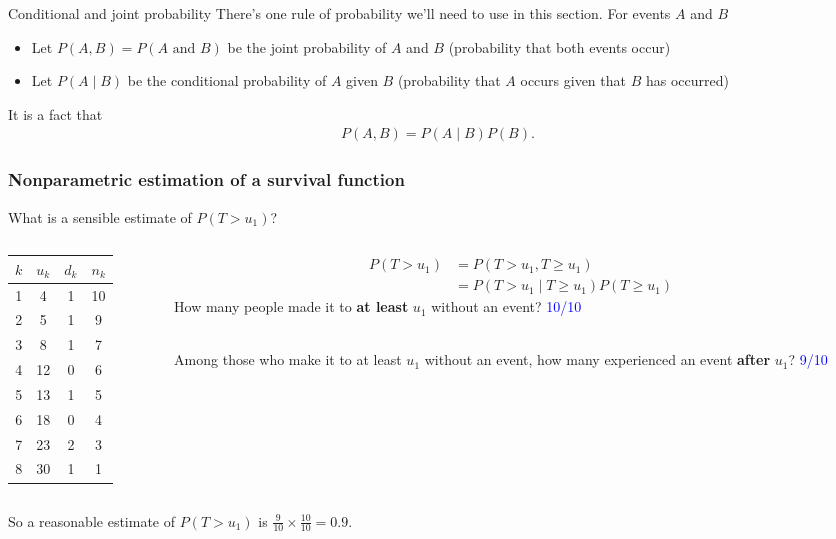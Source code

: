 \documentclass[10pt,t]{beamer}
\begin{document}
\begin{frame}{Conditional and joint probability}
	There's one rule of probability we'll need to use in this section. For events $A$ and $B$
	\begin{itemize}
		\item Let $P(A, B) = P(A \text{ and } B)$ be the joint probability of $A$ and $B$ (probability that both events occur)
		\item Let $P(A \mid B)$ be the conditional probability of $A$ given $B$ (probability that $A$ occurs given that $B$ has occurred)
	\end{itemize}
	It is a fact that
	\begin{align*}
		P(A, B) = P(A \mid B)P(B).
	\end{align*}
\end{frame}

\begin{frame}
\frametitle{Nonparametric estimation of a survival function}
What is a sensible estimate of $P(T > u_1)$?

\begin{columns}
	\begin{column}{0.3\textwidth}
		\begin{center}
\begin{tabular}{|c|c|c|c|}
	\hline
	$k$ & $u_k$ & $d_k$ & $n_k$ \\
	\hline
	1 & 4 & 1 & 10 \\
	2& 5 & 1 & 9 \\
	3& 8 & 1 & 7 \\
	4&12 & 0 & 6 \\
	5&13 & 1 & 5 \\
	6&18 & 0 & 4 \\
	7&23 & 2 & 3 \\
	8&30 & 1 & 1 \\
	\hline
\end{tabular}
	\end{center}
	\end{column}
	\begin{column}{0.7\textwidth}  %
		\begin{align*}
			P(T > u_1) &= P(T > u_1, T\geq u_1) \\
			&= P(T > u_1 \mid T \geq u_1)P(T \geq u_1)
		\end{align*}
		How many people made it to \textbf{at least} $u_1$ without an event? \pause \textcolor{blue}{10/10}
		\\ ~\ 
		
		Among those who make it to at least $u_1$ without an event, how many experienced an event \textbf{after} $u_1$? \pause \textcolor{blue}{9/10} 
	\end{column}
\end{columns}
\vspace{0.5cm}
So a reasonable estimate of $P(T > u_1)$ is $\frac{9}{10} \times \frac{10}{10} = 0.9$.
\end{frame}
\end{document}
